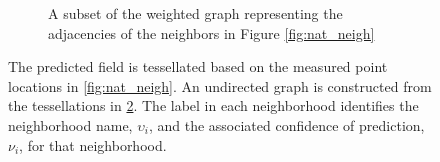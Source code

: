 \begin{figure}[thpb]
\begin{subfigure}[b]{\textwidth}

        \captionsetup{skip=0.5\baselineskip,size=footnotesize}
        \caption{A subset of the weighted graph representing the adjacencies of the neighbors in Figure \ref{fig:nat_neigh}}
        \label{fig:neigh_graph}
  \end{subfigure}
  \captionsetup{skip=0.5\baselineskip,size=small}
  \caption{The predicted field is tessellated based on the measured point locations in \ref{fig:nat_neigh}. An undirected graph is constructed from the tessellations in \ref{fig:neigh_graph}. The label in each neighborhood identifies the neighborhood name, $\upsilon_i$, and the associated confidence of prediction, $\nu_i$, for that neighborhood.}
\end{figure}